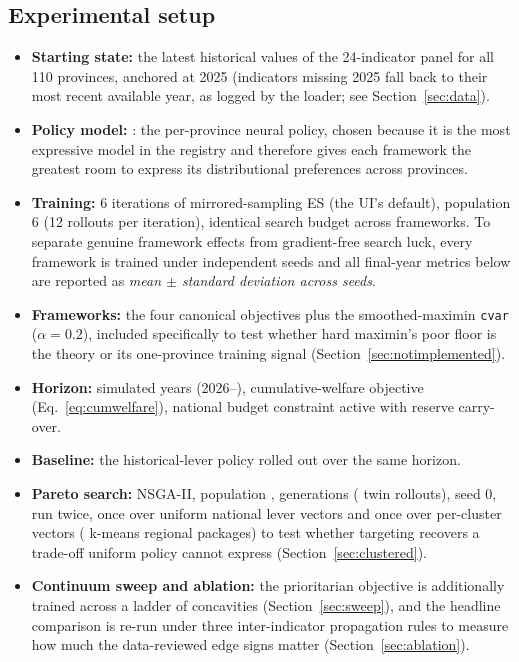 \documentclass[11pt,a4paper]{article}
\newcommand{\code}[1]{\texttt{#1}}
\begin{document}
\subsection{Experimental setup}

\begin{itemize}
    \item \textbf{Starting state:} the latest historical values of the
    24-indicator panel for all 110 provinces, anchored at 2025 (indicators
    missing 2025 fall back to their most recent available year, as logged by
    the loader; see Section~\ref{sec:data}).
    \item \textbf{Policy model:} \code{\cmpModel}: the per-province neural
    policy, chosen because it is the most expressive model in the registry and
    therefore gives each framework the greatest room to express its
    distributional preferences across provinces.
    \item \textbf{Training:} 6 iterations of mirrored-sampling ES (the UI's
    default), population 6 (12 rollouts per iteration), identical search
    budget across frameworks. To separate genuine framework effects from
    gradient-free search luck, every framework is trained under \cmpSeeds{}
    independent seeds and all final-year metrics below are reported as
    \emph{mean $\pm$ standard deviation across seeds}.
    \item \textbf{Frameworks:} the four canonical objectives plus the
    smoothed-maximin \code{cvar} ($\alpha = 0.2$), included specifically to
    test whether hard maximin's poor floor is the theory or its one-province
    training signal (Section~\ref{sec:notimplemented}).
    \item \textbf{Horizon:} \cmpHorizon{} simulated years (2026--\cmpFinalYear),
    cumulative-welfare objective (Eq.~\ref{eq:cumwelfare}), national budget
    constraint active with reserve carry-over.
    \item \textbf{Baseline:} the historical-lever policy rolled out over the
    same horizon.
    \item \textbf{Pareto search:} NSGA-II, population \parPop{}, \parGens{}
    generations (\parEvals{} twin rollouts), seed 0, run twice, once over
    uniform national lever vectors and once over per-cluster vectors
    (\parcClusters{} k-means regional packages) to test whether targeting
    recovers a trade-off uniform policy cannot express
    (Section~\ref{sec:clustered}).
    \item \textbf{Continuum sweep and ablation:} the prioritarian objective is
    additionally trained across a ladder of concavities
    (Section~\ref{sec:sweep}), and the headline comparison is re-run under three
    inter-indicator propagation rules to measure how much the data-reviewed
    edge signs matter (Section~\ref{sec:ablation}).
\end{itemize}
\end{document}
